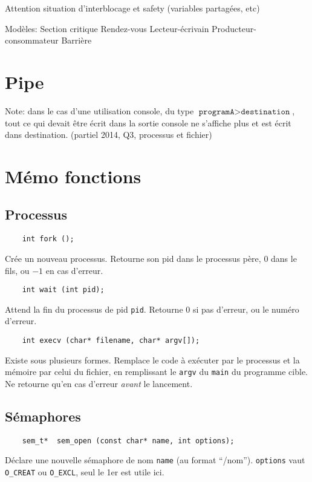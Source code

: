 \documentclass[10pt,twocolumn,a4paper]{article}
\begin{document}
Attention situation d'interblocage et safety (variables partagées, etc)

Modèles:
Section critique
Rendez-vous
Lecteur-\'ecrivain
Producteur-consommateur
Barrière

\section{Pipe}

Note: dans le cas d'une utilisation console, du type $\texttt{programA} > \texttt{destination}$, tout ce qui devait être écrit dans la sortie console ne s'affiche plus et est écrit dans destination. (partiel 2014, Q3, processus et fichier)


\section{Mémo fonctions}

\subsection{Processus}

\begin{lstlisting}
    int fork ();
\end{lstlisting}

Cr\'ee un nouveau processus.
Retourne son pid dans le processus p\`ere, $0$ dans le fils, ou $-1$ en cas d'erreur.

\begin{lstlisting}
    int wait (int pid);
\end{lstlisting}

Attend la fin du processus de pid \texttt{pid}.
Retourne 0 si pas d'erreur, ou le num\'ero d'erreur.

\begin{lstlisting}
    int execv (char* filename, char* argv[]);
\end{lstlisting}

Existe sous plusieurs formes.
Remplace le code à exécuter par le processus et la mémoire par celui du fichier, en remplissant le \texttt{argv} du \texttt{main} du programme cible.
Ne retourne qu'en cas d'erreur \emph{avant} le lancement.

\subsection{Sémaphores}

\begin{lstlisting}
    sem_t*  sem_open (const char* name, int options);
\end{lstlisting}
Déclare une nouvelle sémaphore de nom \texttt{name} (au format ``/nom''). 
\texttt{options} vaut \texttt{O\_CREAT} ou \texttt{O\_EXCL}, seul le 1er est utile ici.
\end{document}
